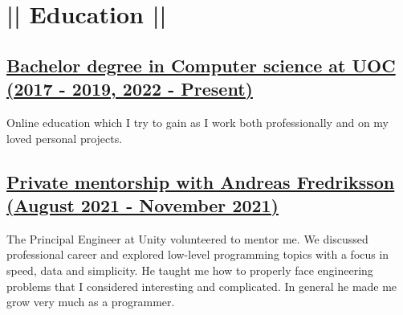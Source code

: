 \section*{|| Education ||}
\subsection*{\underline{Bachelor degree in Computer science at UOC (2017 - 2019, 2022 - Present)}}
Online education which I try to gain as I work both professionally and on my loved personal projects.
\subsection*{\underline{Private mentorship with Andreas Fredriksson (August 2021 - November 2021)}}
The Principal Engineer at Unity volunteered to mentor me. We discussed professional career and explored low-level programming topics with a focus in speed, data and simplicity. He taught me how to properly face engineering problems that I considered interesting and complicated. In general he made me grow very much as a programmer.